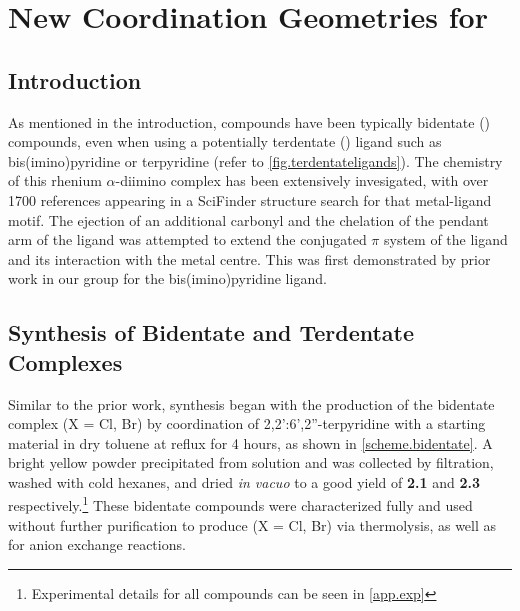 \chapter{New Coordination Geometries for \texorpdfstring{}{Rhenium (I)}}\label{chap.newchem}
\section{Introduction}

As mentioned in the introduction,  compounds have been typically bidentate () compounds, even when using a potentially terdentate () ligand such as bis(imino)pyridine or terpyridine (refer to \autoref{fig.terdentateligands}). The chemistry of this rhenium $\alpha$-diimino complex has been extensively invesigated, with over 1700 references appearing in a SciFinder structure search for that metal-ligand motif\autocite{scifinder}. The ejection of an additional carbonyl and the chelation of the pendant arm of the ligand was attempted to extend the conjugated $\pi$ system of the ligand and its interaction with the metal centre. This was first demonstrated by prior work in our group for the bis(imino)pyridine ligand\autocite{jurca2013}. 

\section{Synthesis of Bidentate and Terdentate \texorpdfstring{}{Rhenium (I)} Complexes}

Similar to the prior work, synthesis began with the production of the bidentate complex  (X = Cl, Br) by coordination of 2,2':6',2''-terpyridine with a  starting material in dry toluene at reflux for 4 hours, as shown in \autoref{scheme.bidentate}. A bright yellow powder precipitated from solution and was collected by filtration, washed with cold hexanes, and dried \textit{in vacuo} to a good yield of \textbf{2.1} and \textbf{2.3} respectively.\footnote{Experimental details for all compounds can be seen in \autoref{app.exp} } These bidentate compounds were characterized fully and used without further purification to produce  (X = Cl, Br) via thermolysis, as well as for anion exchange reactions. 

